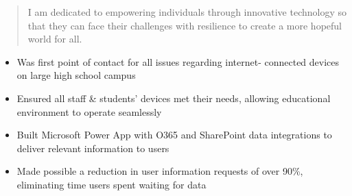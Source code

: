 



\makecvheader

\begin{quote}
  \noindent
  I am dedicated to empowering individuals through innovative
  technology so that they can face their challenges with
  resilience to create a more hopeful world for all.
\end{quote}

\par\smallskip
\noindent
\begin{minipage}{20cm}
  \begin{minipage}{9.75cm}
    \begin{itemize}
      \item Was first point of contact for all issues regarding internet-
            connected devices on large high school campus
      \item Ensured all staff \& students' devices met their needs,
            allowing educational environment to operate seamlessly
    \end{itemize}
  \end{minipage}
  \hfill
  \begin{minipage}{9.75cm}
    \begin{itemize}
      \item Built Microsoft Power App with O365 and SharePoint data
            integrations to deliver relevant information to users
      \item Made possible a reduction in user information requests of
            over 90\%, eliminating time users spent waiting for data
    \end{itemize}
  \end{minipage}
\end{minipage}
\par\smallskip
\divider

